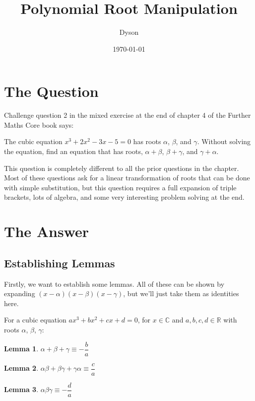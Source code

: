 \documentclass[a4paper]{article}
\title{Polynomial Root Manipulation}
\author{Dyson}
\date{\today}
\newcommand{\sone}{\alpha + \beta + \gamma}
\newcommand{\stwo}{\alpha\beta + \beta\gamma + \gamma\alpha}
\newcommand{\abg}{\alpha\beta\gamma}
\newtheorem{lemma}{Lemma}
\begin{document}
\maketitle

\setlength{\parindent}{0em}
\setlength{\parskip}{1em}

\section{The Question}

Challenge question 2 in the mixed exercise at the end of chapter 4 of the Further Maths Core book says:

The cubic equation $x^3 + 2x^2 -3x - 5 = 0$ has roots $\alpha$, $\beta$, and $\gamma$. Without solving the equation, find an equation that has roots, $\alpha + \beta$, $\beta + \gamma$, and $\gamma + \alpha$.

This question is completely different to all the prior questions in the chapter. Most of these questions ask for a linear transformation of roots that can be done with simple substitution, but this question requires a full expansion of triple brackets, lots of algebra, and some very interesting problem solving at the end.

\section{The Answer}

\subsection{Establishing Lemmas}

Firstly, we want to establish some lemmas. All of these can be shown by expanding $(x - \alpha)(x - \beta)(x - \gamma)$, but we'll just take them as identities here.

For a cubic equation $ax^3 + bx^2 + cx + d = 0$, for $x \in \mathbb{C}$ and $a, b, c, d \in \mathbb{R}$ with roots $\alpha$, $\beta$, $\gamma$:

\begin{lemma}
$\sone \equiv -\dfrac{b}{a}$
\end{lemma}

\begin{lemma}
$\stwo \equiv \dfrac{c}{a}$
\end{lemma}

\begin{lemma}
$\abg \equiv -\dfrac{d}{a}$
\end{lemma}
\end{document}
